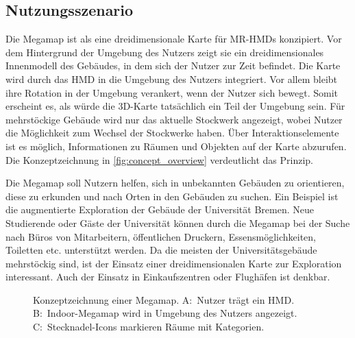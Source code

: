 \subsection{Nutzungsszenario}
Die Megamap ist als eine dreidimensionale Karte für MR-HMDs konzipiert.
Vor dem Hintergrund der Umgebung des Nutzers zeigt sie ein dreidimensionales Innenmodell des Gebäudes, in dem sich der Nutzer zur Zeit befindet.
Die Karte wird durch das HMD in die Umgebung des Nutzers integriert.
Vor allem bleibt ihre Rotation in der Umgebung verankert, wenn der Nutzer sich bewegt.
Somit erscheint es, als würde die 3D-Karte tatsächlich ein Teil der Umgebung sein.
Für mehrstöckige Gebäude wird nur das aktuelle Stockwerk angezeigt, wobei Nutzer die Möglichkeit zum Wechsel der Stockwerke haben.
Über Interaktionselemente ist es möglich, Informationen zu Räumen und Objekten auf der Karte abzurufen.
Die Konzeptzeichnung in \autoref{fig:concept_overview} verdeutlicht das Prinzip.

Die Megamap soll Nutzern helfen, sich in unbekannten Gebäuden zu orientieren, diese zu erkunden und nach Orten in den Gebäuden zu suchen.
Ein Beispiel ist die augmentierte Exploration der Gebäude der Universität Bremen.
Neue Studierende oder Gäste der Universität können durch die Megamap bei der Suche nach Büros von Mitarbeitern, öffentlichen Druckern, Essensmöglichkeiten, Toiletten etc. unterstützt werden.
Da die meisten der Universitätsgebäude mehrstöckig sind, ist der Einsatz einer dreidimensionalen Karte zur Exploration interessant.
Auch der Einsatz in Einkaufszentren oder Flughäfen ist denkbar.
\begin{figure}[thb]
	\centering
	\caption{Konzeptzeichnung einer Megamap. %
		A:~Nutzer trägt ein HMD. %
		B:~Indoor-Megamap wird in Umgebung des Nutzers angezeigt. %
		C:~Stecknadel-Icons markieren Räume mit Kategorien.}
	\label{fig:concept_overview}
\end{figure}

